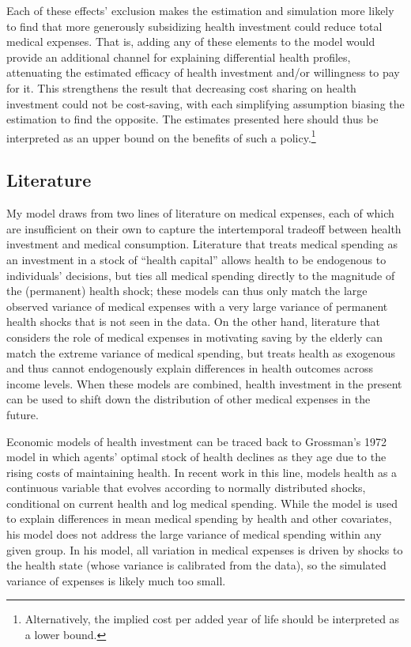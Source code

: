 \documentclass[12pt,pdftex,letterpaper]{article}
\begin{document}
Each of these effects' exclusion makes the estimation and simulation more likely to find that more generously subsidizing health investment could reduce total medical expenses.  That is, adding any of these elements to the model would provide an additional channel for explaining differential health profiles, attenuating the estimated efficacy of health investment and/or willingness to pay for it.  This strengthens the result that decreasing cost sharing on health investment could not be cost-saving, with each simplifying assumption biasing the estimation to find the opposite.  The estimates presented here should thus be interpreted as an upper bound on the benefits of such a policy.\footnote{Alternatively, the implied cost per added year of life should be interpreted as a lower bound.}



\subsection{Literature}
\label{sec:Lit}

My model draws from two lines of literature on medical expenses, each of which are insufficient on their own to capture the intertemporal tradeoff between health investment and medical consumption.  Literature that treats medical spending as an investment in a stock of ``health capital'' allows health to be endogenous to individuals' decisions, but ties all medical spending directly to the magnitude of the (permanent) health shock; these models can thus only match the large observed variance of medical expenses with a very large variance of permanent health shocks that is not seen in the data.  On the other hand, literature that considers the role of medical expenses in motivating saving by the elderly can match the extreme variance of medical spending, but treats health as exogenous and thus cannot endogenously explain differences in health outcomes across income levels.  When these models are combined, health investment in the present can be used to shift down the distribution of other medical expenses in the future.

Economic models of health investment can be traced back to Grossman's 1972 model in which agents' optimal stock of health declines as they age due to the rising costs of maintaining health.  In recent work in this line, \cite{yogo09} models health as a continuous variable that evolves according to normally distributed shocks, conditional on current health and log medical spending.  While the model is used to explain differences in mean medical spending by health and other covariates, his model does not address the large variance of medical spending within any given group.  In his model, all variation in medical expenses is driven by shocks to the health state (whose variance is calibrated from the data), so the simulated variance of expenses is likely much too small.
\end{document}
